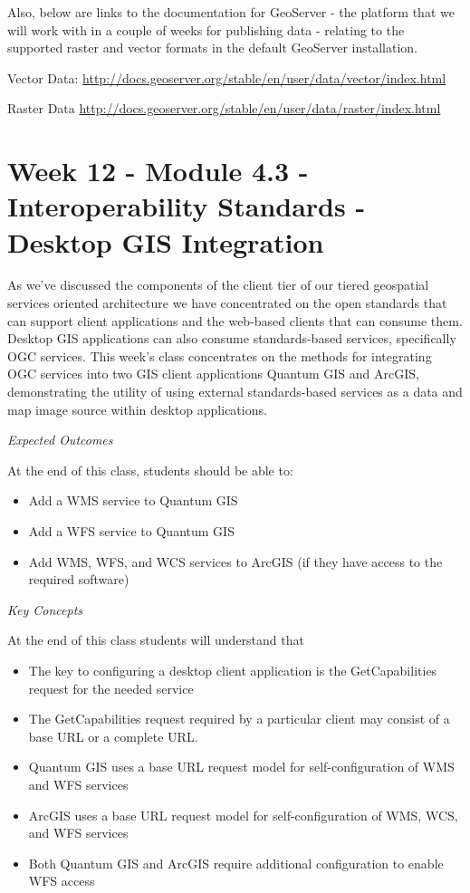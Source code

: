 \documentclass[]{book}
\providecommand{\tightlist}{%
  \setlength{\itemsep}{0pt}\setlength{\parskip}{0pt}}
\begin{document}
Also, below are links to the documentation for GeoServer - the platform
that we will work with in a couple of weeks for publishing data -
relating to the supported raster and vector formats in the default
GeoServer installation.

Vector Data:
\url{http://docs.geoserver.org/stable/en/user/data/vector/index.html}

Raster Data
\url{http://docs.geoserver.org/stable/en/user/data/raster/index.html}

\chapter{Week 12 - Module 4.3 - Interoperability Standards - Desktop GIS
Integration}\label{week12}

As we've discussed the components of the client tier of our tiered
geospatial services oriented architecture we have concentrated on the
open standards that can support client applications and the web-based
clients that can consume them. Desktop GIS applications can also consume
standards-based services, specifically OGC services. This week's class
concentrates on the methods for integrating OGC services into two GIS
client applications Quantum GIS and ArcGIS, demonstrating the utility of
using external standards-based services as a data and map image source
within desktop applications.

\emph{Expected Outcomes}

At the end of this class, students should be able to:

\begin{itemize}
\tightlist
\item
  Add a WMS service to Quantum GIS
\item
  Add a WFS service to Quantum GIS
\item
  Add WMS, WFS, and WCS services to ArcGIS (if they have access to the
  required software)
\end{itemize}

\emph{Key Concepts}

At the end of this class students will understand that

\begin{itemize}
\tightlist
\item
  The key to configuring a desktop client application is the
  GetCapabilities request for the needed service
\item
  The GetCapabilities request required by a particular client may
  consist of a base URL or a complete URL.
\item
  Quantum GIS uses a base URL request model for self-configuration of
  WMS and WFS services
\item
  ArcGIS uses a base URL request model for self-configuration of WMS,
  WCS, and WFS services
\item
  Both Quantum GIS and ArcGIS require additional configuration to enable
  WFS access
\end{itemize}
\end{document}
